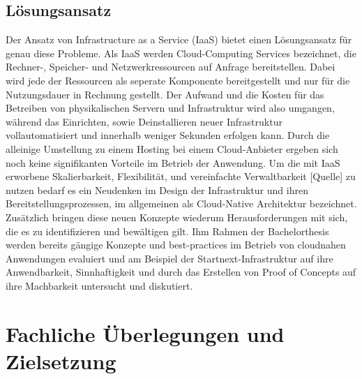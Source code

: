 \documentclass[11pt]{scrartcl}
\begin{document}
\subsection{Lösungsansatz}
Der Ansatz von Infrastructure as a Service (IaaS) bietet einen Lösungsansatz für genau diese Probleme.
Als IaaS werden Cloud-Computing Services bezeichnet, die Rechner-, Speicher- und Netzwerkressourcen auf Anfrage bereitstellen. Dabei wird jede der Ressourcen als seperate Komponente bereitgestellt und nur für die Nutzungsdauer in Rechnung gestellt. Der Aufwand und die Kosten für das Betreiben von physikalischen Servern und Infrastruktur wird also umgangen, während das Einrichten, sowie Deinstallieren neuer Infrastruktur vollautomatisiert und innerhalb weniger Sekunden erfolgen kann. Durch die alleinige Umstellung zu einem Hosting bei einem Cloud-Anbieter ergeben sich noch keine signifikanten Vorteile im Betrieb der Anwendung. Um die mit IaaS erworbene Skalierbarkeit, Flexibilität, und vereinfachte Verwaltbarkeit [Quelle] zu nutzen bedarf es ein Neudenken im Design der Infrastruktur und ihren Bereitstellungsprozessen, im allgemeinen als Cloud-Native Architektur bezeichnet. Zusätzlich bringen diese neuen Konzepte wiederum Herausforderungen mit sich, die es zu identifizieren und bewältigen gilt. \newline 
Ihm Rahmen der Bachelorthesis werden bereits g{\"a}ngige Konzepte und \glqq best-practices\grqq{} im Betrieb von cloudnahen Anwendungen evaluiert und am Beispiel der Startnext-Infrastruktur auf ihre Anwendbarkeit, Sinnhaftigkeit und durch das Erstellen von Proof of Concepts auf ihre Machbarkeit untersucht und diskutiert. 


\section{\label{sec:fachliche_ueberlegungen} Fachliche Überlegungen und Zielsetzung}
\end{document}
